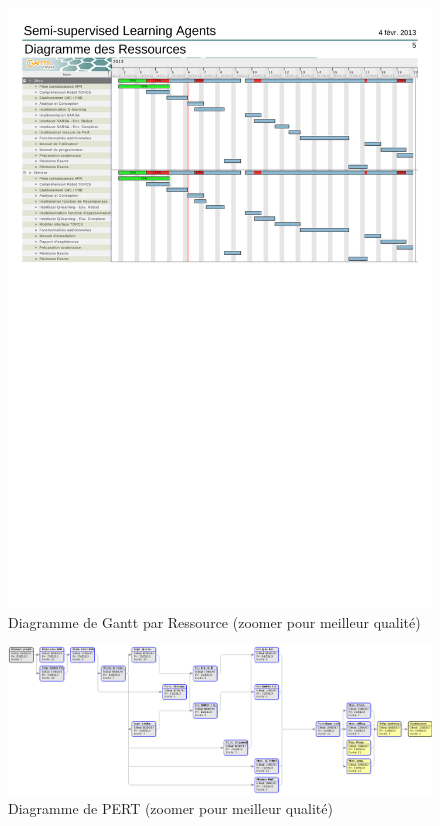 \documentclass[a4paper,12pt]{article}
\begin{document}
      \begin{figure}[h!]
	\centerline{\includegraphics[width=20cm, clip=true, trim= 0 450 0 72]{../images/GanttR.pdf} }
	\caption{Diagramme de Gantt par Ressource \scriptsize{(zoomer pour meilleur qualité)}}
      \end{figure}
	
      \begin{figure}[h!]
	\centerline{\includegraphics[width=19cm, clip=true, trim= 0 0 0 0]{../images/Gantt_PERT.png} }
	\caption{Diagramme de PERT \scriptsize{(zoomer pour meilleur qualité)}}
      \end{figure}
	
\begin{center}

\end{center}
\end{document}

